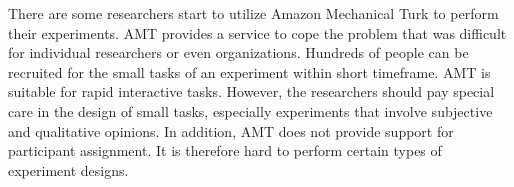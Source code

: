 \documentclass[prodmode]{acmsmall} %
\begin{document}
There are some researchers start to utilize Amazon Mechanical Turk to perform their experiments. AMT provides a service to cope the problem that was difficult for individual researchers or even organizations. Hundreds of people can be recruited for the small tasks of an experiment within short timeframe. AMT is suitable for rapid interactive tasks. However, the researchers should pay special care in the design of small tasks, especially experiments that involve subjective and qualitative opinions. In addition, AMT does not provide support for participant assignment. It is therefore hard to perform certain types of experiment designs. \cite{Kittur2008}



\end{document}
